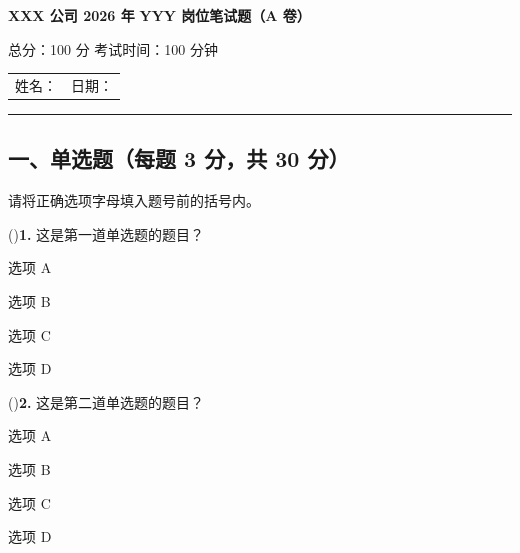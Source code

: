 \documentclass[11pt,a4paper]{article}
\begin{document}
\begin{center}
{\LARGE\bfseries\sffamily XXX 公司 2026 年}
\hspace{0.5em}
{\LARGE\bfseries\sffamily YYY 岗位笔试题（A 卷）}

\vspace{0.6em}
{\large 总分：100 分 \quad 考试时间：100 分钟}

\vspace{0.4em}
\begin{tabularx}{0.7\textwidth}{Xr}
姓名：\underline{\hspace{6em}} & 日期：\underline{\hspace{6em}}
\end{tabularx}
\end{center}

\vspace{0.3em}
\noindent\rule{\linewidth}{0.4pt}
\vspace{0.2em}

\subsection*{一、单选题（每题 3 分，共 30 分）}
\vspace{0.2em}
\noindent\small{请将正确选项字母填入题号前的括号内。}
\vspace{0.3em}

\noindent(\hspace{1.5em})\enspace\textbf{1.} 这是第一道单选题的题目？

\begin{choices}
\item 选项 A
\item 选项 B
\item 选项 C
\item 选项 D
\end{choices}

\noindent(\hspace{1.5em})\enspace\textbf{2.} 这是第二道单选题的题目？

\begin{choices}
\item 选项 A
\item 选项 B
\item 选项 C
\item 选项 D
\end{choices}


\end{document}
